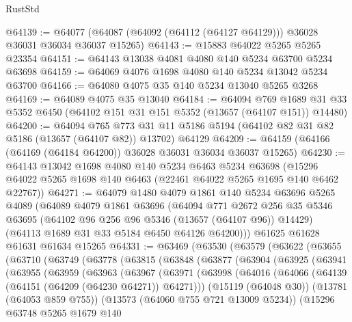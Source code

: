 \begin{lexlean}{RustStd}
\begin{coremodule}
@64139 := @64077 (@64087 (@64092 (@64112 (@64127 @64129))) @36028 @36031 @36034 @36037 @15265)
@64143 := @15883 @64022 @5265 @5265 @23354
@64151 := @64143 @13038 @4081 @4080 @140 @5234 @63700 @5234 @63698
@64159 := @64069 @4076 @1698 @4080 @140 @5234 @13042 @5234 @63700
@64166 := @64080 @4075 @35 @140 @5234 @13040 @5265 @3268
@64169 := @64089 @4075 @35 @13040
@64184 := @64094
    @769
    @1689
    @31
    @33
    @5352
    @6450
    (@64102 @151 @31 @151 @5352 (@13657 (@64107 @151)) @14480)
@64200 := @64094
    @765
    @773
    @31
    @11
    @5186
    @5194
    (@64102 @82 @31 @82 @5186 (@13657 (@64107 @82)) @13702)
    @64129
@64209 := @64159 (@64166 (@64169 (@64184 @64200)) @36028 @36031 @36034 @36037 @15265)
@64230 := @64143
    @13042
    @1698
    @4080
    @140
    @5234
    @6463
    @5234
    @63698
    (@15296 @64022 @5265 @1698 @140 @6463 (@22461 @64022 @5265 @1695 @140 @6462 @22767))
@64271 := @64079
    @1480
    @4079
    @1861
    @140
    @5234
    @63696
    @5265
    @4089
    (@64089
      @4079
      @1861
      @63696
      (@64094
        @771
        @2672
        @256
        @35
        @5346
        @63695
        (@64102 @96 @256 @96 @5346 (@13657 (@64107 @96)) @14429)
        (@64113 @1689 @31 @33 @5184 @6450 @64126 @64200)))
    @61625
    @61628
    @61631
    @61634
    @15265
@64331 := @63469
    (@63530
      (@63579
        (@63622
          (@63655
            (@63710
              (@63749
                (@63778
                  (@63815
                    (@63848
                      (@63877
                        (@63904
                          (@63925
                            (@63941
                              (@63955
                                (@63959
                                  (@63963
                                    (@63967
                                      (@63971
                                        (@63998
                                          (@64016
                                            (@64066
                                              (@64139 (@64151 (@64209 (@64230 @64271)) @64271)))
                                            (@15119 (@64048 @30))
                                            (@13781 (@64053 @859 @755))
                                            (@13573 (@64060 @755 @721 @13009 @5234))
                                            (@15296
                                              @63748
                                              @5265
                                              @1679
                                              @140

\end{coremodule}
\end{lexlean}
